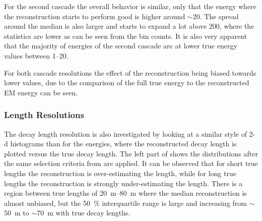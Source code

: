 For the second cascade the overall behavior is similar, only that the energy where the reconstruction starts to perform good is higher around $\sim$\SI{20}{\gev}. The spread around the median is also larger and starts to expand a lot above \SI{200}{\gev}, where the statistics are lower as can be seen from the bin counts. It is also very apparent that the majority of energies of the second cascade are at lower true energy values between \SIrange[range-phrase=~and~]{1}{20}{\gev}.

For both cascade resolutions the effect of the reconstruction being biased towards lower values, due to the comparison of the full true energy to the reconstructed EM energy can be seen.


\subsubsection{Length Resolutions}

The decay length resolution is also investigated by looking at a similar style of 2-d histograms than for the energies, where the reconstructed decay length is plotted versus the true decay length. The left part of  shows the distributions after the same selection criteria from  are applied. It can be observed that for short true lengths the reconstruction is over-estimating the length, while for long true lengths the reconstruction is strongly under-estimating the length. There is a region between true lengths of \SIrange[range-phrase=~and~]{20}{80}{\meter} where the median reconstruction is almost unbiased, but the \SI{50}{\percent} interquartile range is large and increasing from $\sim$\SI{50}{\meter} to $\sim$\SI{70}{\meter} with true decay lengths.

